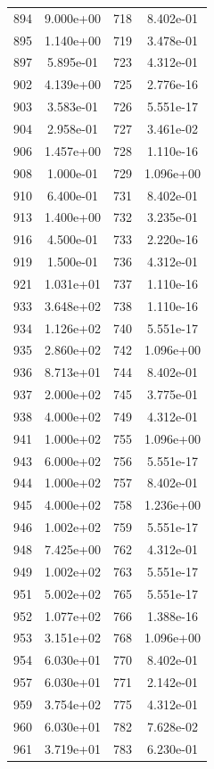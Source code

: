 \documentclass[12pt]{article}
\begin{document}
\begin{longtable}{@{}cccc@{}}
894 & 9.000e+00 & 718 & 8.402e-01 \\
895 & 1.140e+00 & 719 & 3.478e-01 \\
897 & 5.895e-01 & 723 & 4.312e-01 \\
902 & 4.139e+00 & 725 & 2.776e-16 \\
903 & 3.583e-01 & 726 & 5.551e-17 \\
904 & 2.958e-01 & 727 & 3.461e-02 \\
906 & 1.457e+00 & 728 & 1.110e-16 \\
908 & 1.000e-01 & 729 & 1.096e+00 \\
910 & 6.400e-01 & 731 & 8.402e-01 \\
913 & 1.400e+00 & 732 & 3.235e-01 \\
916 & 4.500e-01 & 733 & 2.220e-16 \\
919 & 1.500e-01 & 736 & 4.312e-01 \\
921 & 1.031e+01 & 737 & 1.110e-16 \\
933 & 3.648e+02 & 738 & 1.110e-16 \\
934 & 1.126e+02 & 740 & 5.551e-17 \\
935 & 2.860e+02 & 742 & 1.096e+00 \\
936 & 8.713e+01 & 744 & 8.402e-01 \\
937 & 2.000e+02 & 745 & 3.775e-01 \\
938 & 4.000e+02 & 749 & 4.312e-01 \\
941 & 1.000e+02 & 755 & 1.096e+00 \\
943 & 6.000e+02 & 756 & 5.551e-17 \\
944 & 1.000e+02 & 757 & 8.402e-01 \\
945 & 4.000e+02 & 758 & 1.236e+00 \\
946 & 1.002e+02 & 759 & 5.551e-17 \\
948 & 7.425e+00 & 762 & 4.312e-01 \\
949 & 1.002e+02 & 763 & 5.551e-17 \\
951 & 5.002e+02 & 765 & 5.551e-17 \\
952 & 1.077e+02 & 766 & 1.388e-16 \\
953 & 3.151e+02 & 768 & 1.096e+00 \\
954 & 6.030e+01 & 770 & 8.402e-01 \\
957 & 6.030e+01 & 771 & 2.142e-01 \\
959 & 3.754e+02 & 775 & 4.312e-01 \\
960 & 6.030e+01 & 782 & 7.628e-02 \\
961 & 3.719e+01 & 783 & 6.230e-01 \\

\end{longtable}
\end{document}
